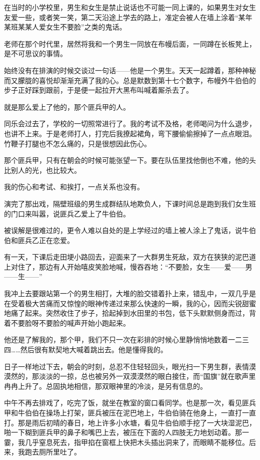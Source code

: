 \par 在当时的小学校里，男生和女生是禁止说话也不可能一同上课的，如果男生对女生友爱一些，或者笑一笑，第二天沿途上学去的路上，准定会被人在墙上涂着“某年某班某某人爱女生不要脸”之类的鬼话。
\par 老师在那个时代里，居然将我和一个男生一同放在布幔后面，一同蹲在长板凳上，是不可思议的事情。
\par 始终没有在排演的时候交谈过一句话——他是一个男生。天天一起蹲着，那种神秘而又朦胧的喜悦却渐渐充满了我的心。总是默数到第十七个数字，布幔外牛伯伯的步子正好踩到跟前，于是便一起拉开大黑布叫喊着厮杀去了。
\par 就是那么爱上了他的，那个匪兵甲的人。
\par 同乐会过去了，学校的一切照常进行了。我的考试不及格，老师喝问为什么退步，也讲不上来。于是老师打人，打完后我撩起裙角，弯下腰偷偷擦掉了一点点眼泪。竹鞭子打腿也不怎么痛的，只是很想因此伤心。
\par 那个匪兵甲，只有在朝会的时候可能张望一下。要在队伍里找他倒也不难，他的头比别人的光，也比较大。
\par 我的伤心和考试、和挨打，一点关系也没有。
\par 演完了那出戏，隔壁班级的男生成群结队地欺负人，下课时间总是跑到我们女生班的门口来叫嚣，说匪兵乙爱上了牛伯伯。
\par 被误解是很难过的，更令人难以自处的是上学经过的墙上被人涂上了鬼话，说牛伯伯和匪兵乙正在恋爱。
\par 有一天，下课后走田埂小路回去，迎面来了一大群男生死敌，双方在狭狭的泥巴道上对住了，那边有人开始嘻皮笑脸地喊，慢吞吞地：“不要脸，女生——爱——男——生——”
\par 我冲上去要跟站第一个的男生相打，大堆的脸交错着扑上来，错乱中，一双几乎是在受着极大苦痛而又惊惶的眼神传递过来那么快速的一瞬，我的心，因而尖锐甜蜜地痛了起来。突然收住了步子，拾起掉到水田里的书包，低下头默默侧身而过，背着不要脸呀不要脸的喊声开始小跑起来。
\par 他还是了解我的，那个甲，我们不只一次在彩排的时候心里静悄悄地数着一二三四……然后很有默契地大喊着跳出去。他是懂得我的。
\par 日子一样地过下去，朝会的时刻，总忍不住轻轻回头，眼光扫一下男生群，表情漠漠然的，那淡淡的一掠，总也被另外一双漠漠然的眼白接住，而“国旗”就在歌声里冉冉上升了。总固执地相信，那双眼神里的冷淡，是另有信息的。
\par 中午不再去排戏了，吃完了饭，就坐在教室的窗口看同学。也是那一次，看见匪兵甲和牛伯伯在操场上打架，匪兵被压在泥巴地上，牛伯伯骑在他身上，一直打一直打。那是雨后初晴的春日，地上许多小水塘，看见牛伯伯顺手挖了一大块湿泥巴，啪一下糊到匪兵甲的鼻子和嘴巴上去，被压在下面的人四肢无力地划动着。那一霎，我几乎窒息死去，指甲掐在窗框上快把木头插出洞来了，而眼睛不能移位。后来，我跑去厕所里吐了。
